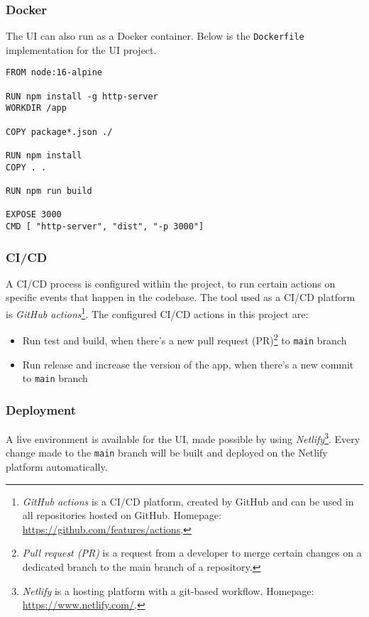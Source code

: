   \subsubsection{Docker}
  The UI can also run as a Docker container. Below is the \verb;Dockerfile; implementation for the UI project. 

  \begin{lstlisting}[caption={Dockerfile for UI (Docker)}, language=docker]
FROM node:16-alpine

RUN npm install -g http-server
WORKDIR /app

COPY package*.json ./

RUN npm install
COPY . .

RUN npm run build

EXPOSE 3000
CMD [ "http-server", "dist", "-p 3000"]
      \end{lstlisting}

  \subsubsection{CI/CD}
  A CI/CD process is configured within the project, to run certain actions on specific events that happen in the codebase. The tool used as a CI/CD platform is \emph{GitHub actions}\footnote{\emph{GitHub actions} is a CI/CD platform, created by GitHub and can be used in all repositories hosted on GitHub. Homepage: \url{https://github.com/features/actions}.}. The configured CI/CD actions in this project are:

   \begin{itemize}
    \item Run test and build, when there's a new pull request (PR)\footnote{\emph{Pull request (PR)} is a request from a developer to merge certain changes on a dedicated branch to the main branch of a repository.} to \verb;main; branch
    \item Run release and increase the version of the app, when there's a new commit to \verb;main; branch
   \end{itemize}
  
  \subsubsection{Deployment}
  A live environment is available for the UI, made possible by using \emph{Netlify}\footnote{\emph{Netlify} is a hosting platform with a git-based workflow. Homepage: \url{https://www.netlify.com/}.}. Every change made to the \verb;main; branch will be built and deployed on the Netlify platform automatically. 

